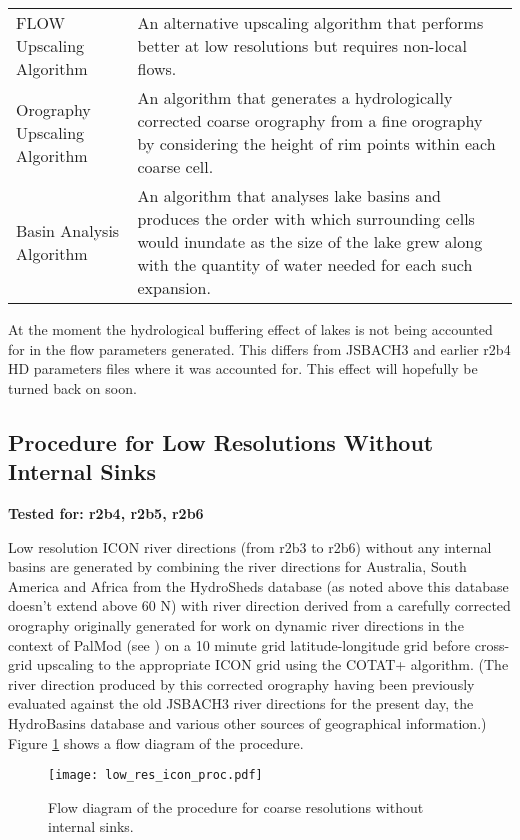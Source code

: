 \documentclass{article}
\begin{document}
{\begin{center}
\begin{longtable} { | l | p{8cm} |}
FLOW Upscaling Algorithm & An alternative upscaling algorithm that performs better at low resolutions but requires non-local flows.\\
Orography Upscaling Algorithm &An algorithm that generates a hydrologically corrected coarse orography from a fine orography by considering the height of rim points within each coarse cell. \\
Basin Analysis Algorithm & An algorithm that analyses lake basins and produces the order with which surrounding cells would inundate as the size of the lake grew along with the quantity of water needed for each such expansion. \\
\hline
\end{longtable}
\label{table-tools-descs}
\end{center}}

At the moment the hydrological buffering effect of lakes is not being accounted for in the flow parameters generated. This differs from JSBACH3 and earlier r2b4 HD parameters files where it was accounted for. This effect will hopefully be turned back on soon.

\subsection{Procedure for Low Resolutions Without Internal Sinks}
\noindent\textbf{Tested for: r2b4, r2b5, r2b6}

\noindent Low resolution ICON river directions (from r2b3 to r2b6) without any internal basins are generated by combining the river directions for Australia, South America and Africa from the HydroSheds database (as noted above this database doesn't extend above 60 \degree N) with river direction derived from a carefully corrected orography originally generated for work on dynamic river directions in the context of PalMod (see \cite{gmd-11-4291-2018}) on a 10 minute grid latitude-longitude grid before cross-grid upscaling to the appropriate ICON grid using the COTAT+ algorithm. (The river direction produced by this corrected orography having been previously evaluated against the old JSBACH3 river directions for the present day, the HydroBasins database and various other sources of geographical information.) Figure \ref{fig-low-res-icon-proc} shows a flow diagram of the procedure. \newline

\begin{figure}
\texttt{[image: low\_res\_icon\_proc.pdf]}
\caption{Flow diagram of the procedure for coarse resolutions without internal sinks.}
\label{fig-low-res-icon-proc}
\end{figure}
\end{document}
